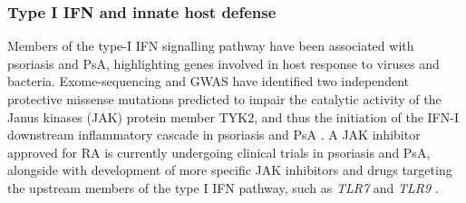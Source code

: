 


\subsubsection*{Type I IFN and innate host defense}

Members of the type-I IFN signalling pathway have been associated with psoriasis and PsA, highlighting genes involved in host response to viruses and bacteria. 
Exome-sequencing and GWAS have identified two independent protective missense mutations predicted to impair the catalytic activity of the Janus kinases (JAK) protein member TYK2, and thus the initiation of the IFN-I downstream inflammatory cascade in psoriasis and PsA \parencite{Strange2010, Tsoi2012, Dand2017}. A JAK inhibitor approved for RA is currently undergoing clinical trials in psoriasis and PsA, alongside with development of more specific JAK inhibitors and drugs targeting the upstream members of the type I IFN pathway, such as \textit{TLR7} and \textit{TLR9} \parencite{Yogo2016,Baker2017}.

